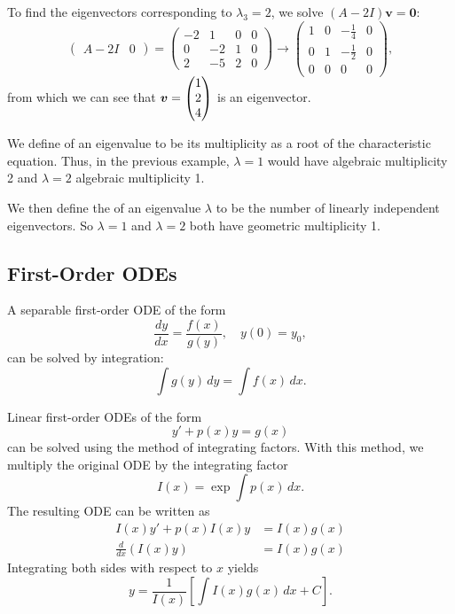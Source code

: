 \begin{eg}
	To find the eigenvectors corresponding to $\lambda_3 = 2$, we solve $(A-2I)\bm{v}=\bm{0}$:
	\[
	\left(\begin{array}{r|r}A-2I & 0\end{array}\right) = \left(\begin{array}{rrr|r}-2 & 1 & 0 & 0\\ 0 & -2 & 1 & 0 \\ 2 & -5 & 2 & 0\end{array}\right) \rightarrow \left(\begin{array}{rrr|r}1 & 0 & -\frac14 & 0\\ 0 & 1 & -\frac12 & 0 \\ 0 & 0 & 0 & 0\end{array}\right),
	\]
	from which we can see that $\bm{v} = \begin{pmatrix}1\\2\\4\end{pmatrix}$ is an eigenvector.
\end{eg}

We define  of an eigenvalue to be its multiplicity as a root of the characteristic equation. Thus, in the previous example, $\lambda=1$ would have algebraic multiplicity 2 and $\lambda=2$ algebraic multiplicity 1.

We then define the  of an eigenvalue $\lambda$ to be the number of linearly independent eigenvectors. So $\lambda=1$ and $\lambda=2$ both have geometric multiplicity 1.


\subsection{First-Order ODEs}

A separable first-order ODE of the form
\begin{equation}
	\frac{dy}{dx} = \frac{f(x)}{g(y)}, \quad y(0) = y_0,
\end{equation}
can be solved by integration:
\[
\int g(y) \,dy = \int f(x) \,dx.
\]

Linear first-order ODEs of the form
\begin{equation}
	y' + p(x)y = g(x)
\end{equation}
can be solved using the method of integrating factors. With this method, we multiply the original ODE by the integrating factor
\[
I(x) = \exp \int p(x)\,dx.
\]
The resulting ODE can be written as
\begin{align*}
	I(x)y' + p(x)I(x)y &= I(x)g(x) \\
	\frac{d}{dx}(I(x)y) &= I(x)g(x)
\end{align*}
Integrating both sides with respect to $x$ yields
\[
y = \frac{1}{I(x)}\left[\int I(x)g(x) \,dx + C\right].
\]

